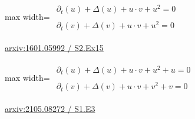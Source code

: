 \documentclass[10pt,a4paper]{article}
\begin{document}
\begin{minipage}{\linewidth}
\begin{center}\begin{adjustbox}{max width=\linewidth}$\displaystyle\begin{gathered}\begin{gathered}\partial_{t}(u)+\Delta(u)+u\cdot v+u^{2}=0\end{gathered}\\[5pt]\begin{gathered}\partial_{t}(v)+\Delta(v)+u\cdot v+u^{2}=0\end{gathered}\end{gathered}$\end{adjustbox}\end{center}
{\small \href{https://arxiv.org/html/1601.05992#S2.Ex15}{arxiv:1601.05992 / S2.Ex15}}\par
\end{minipage}\par\vspace{7mm}

\begin{minipage}{\linewidth}
\begin{center}\begin{adjustbox}{max width=\linewidth}$\displaystyle\begin{gathered}\begin{gathered}\partial_{t}(u)+\Delta(u)+u\cdot v+u^{2}+u=0\end{gathered}\\[5pt]\begin{gathered}\partial_{t}(v)+\Delta(v)+u\cdot v+v^{2}+v=0\end{gathered}\end{gathered}$\end{adjustbox}\end{center}
{\small \href{https://arxiv.org/html/2105.08272#S1.E3}{arxiv:2105.08272 / S1.E3}}\par
\end{minipage}\par\vspace{7mm}
\end{document}
